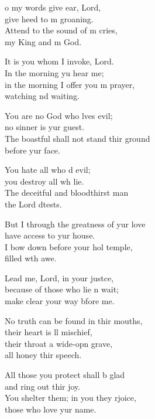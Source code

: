 \settowidth{\versewidth}{you surround him with favour as with a shield.}
\begin{psalmverse}%
  \begin{patverse}
    o my words give ear,  Lord,\Med\\
    give heed to m groaning.\\
    Attend to the sound of m cries,\Med\\
    my King and m God.

It is you whom I invoke,  Lord.\Med\\
    In the morning yu hear me;\\
in the morning I offer you m prayer,\Med\\
    watching nd waiting.

You are no God who lves evil;\Med\\
    no sinner is yur guest.\\
The boastful shall not stand thir ground\Med\\
    before yur face.

You hate all who d evil;\Med\\
    you destroy all wh lie.\\
The deceitful and bloodthirst man\Med\\
    the Lord dtests.

But I through the greatness of yur love\Med\\
    have access to yur house.\\
I bow down before your hol temple,\Med\\
    filled w\pointup{\i}th awe.

Lead me, Lord, in your just\pointup{\i}ce,\Flex\\
    because of those who lie \pointup{\i}n wait;\Med\\
    make clear your way bfore me.

No truth can be found in thir mouths,\Med\\
    their heart is ll mischief,\\
their throat a wide-opn grave,\Med\\
    all honey thir speech.

All those you protect shall b glad\Med\\
    and ring out thir joy.\\
You shelter them; in you they rjoice,\Med\\
    those who love yur name.


\end{patverse}
\end{psalmverse}
